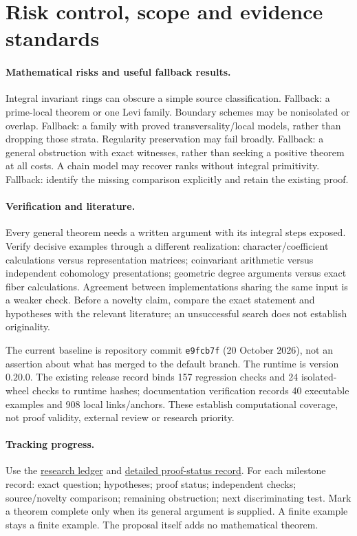\documentclass[11pt,letterpaper]{article}
\newcommand{\repo}{https://github.com/sean-rogers-t/Sage-programs/blob/e9fcb7f3b7d28bea9c248abab1f01d8de28250aa/}
\newcommand{\record}[2]{\href{\repo#1}{#2}}
\begin{document}
\newpage
\section{Risk control, scope and evidence standards}
\paragraph{Mathematical risks and useful fallback results.}
Integral invariant rings can obscure a simple source classification.
Fallback: a prime-local theorem or one Levi family.
Boundary schemes may be nonisolated or overlap. Fallback: a family with
proved transversality/local models, rather than dropping those strata.
Regularity preservation may fail broadly. Fallback: a general obstruction
with exact witnesses, rather than seeking a positive theorem at all costs.
A chain model may recover ranks without integral primitivity. Fallback:
identify the missing comparison explicitly and retain the existing proof.

\paragraph{Verification and literature.}
Every general theorem needs a written argument with its integral steps
exposed. Verify decisive examples through a different realization:
character/coefficient calculations versus representation matrices;
coinvariant arithmetic versus independent cohomology presentations;
geometric degree arguments versus exact fiber calculations.
Agreement between implementations sharing the same input is a weaker check.
Before a novelty claim, compare the exact statement and hypotheses with the
relevant literature; an unsuccessful search does not establish originality.

The current baseline is repository commit
\texttt{e9fcb7f} (20 October 2026), not an assertion about what has merged
to the default branch. The runtime is version \(0.20.0\).
The existing release record binds 157 regression checks and 24 isolated-wheel
checks to runtime hashes; documentation verification records 40 executable
examples and 908 local links/anchors. These establish computational coverage,
not proof validity, external review or research priority.

\paragraph{Tracking progress.}
Use the \record{borel/RESEARCH_LEDGER.md}{research ledger} and
\record{borel/PROOF_STATUS.md}{detailed proof-status record}.
For each milestone record: exact question; hypotheses; proof status;
independent checks; source/novelty comparison; remaining obstruction;
next discriminating test. Mark a theorem complete only when its general
argument is supplied. A finite example stays a finite example.
The proposal itself adds no mathematical theorem.
\end{document}
